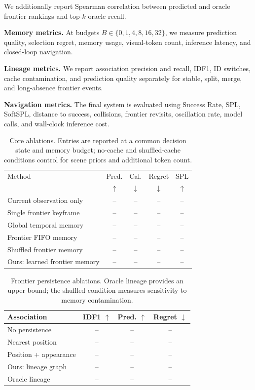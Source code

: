 \documentclass[10pt,twocolumn]{article}
\begin{document}
We additionally report Spearman correlation between predicted and oracle
frontier rankings and top-\(k\) oracle recall.

\textbf{Memory metrics.}
At budgets \(B\in\{0,1,4,8,16,32\}\), we measure prediction quality,
selection regret, memory usage, visual-token count, inference latency, and
closed-loop navigation.

\textbf{Lineage metrics.}
We report association precision and recall, IDF1, ID switches, cache
contamination, and prediction quality separately for stable, split, merge,
and long-absence frontier events.

\textbf{Navigation metrics.}
The final system is evaluated using Success Rate, SPL, SoftSPL, distance to
success, collisions, frontier revisits, oscillation rate, model calls, and
wall-clock inference cost.

\begin{table}[t]
\centering
\footnotesize
\setlength{\tabcolsep}{3.5pt}
\caption{Core ablations. Entries are reported at a common decision state and
memory budget; no-cache and shuffled-cache conditions control for scene priors
and additional token count.}
\label{tab:ablations}
\begin{tabular}{lcccc}
\toprule
Method & Pred. & Cal. & Regret & SPL\\
& \(\uparrow\) & \(\downarrow\) & \(\downarrow\) & \(\uparrow\)\\
\midrule
Current observation only & -- & -- & -- & --\\
Single frontier keyframe & -- & -- & -- & --\\
Global temporal memory & -- & -- & -- & --\\
Frontier FIFO memory & -- & -- & -- & --\\
Shuffled frontier memory & -- & -- & -- & --\\
Ours: learned frontier memory & -- & -- & -- & --\\
\bottomrule
\end{tabular}
\end{table}

\begin{table}[t]
\centering
\footnotesize
\setlength{\tabcolsep}{4pt}
\caption{Frontier persistence ablations. Oracle lineage provides an upper
bound; the shuffled condition measures sensitivity to memory contamination.}
\label{tab:lineage}
\begin{tabular}{lccc}
\toprule
Association & IDF1 \(\uparrow\) & Pred. \(\uparrow\) & Regret \(\downarrow\)\\
\midrule
No persistence & -- & -- & --\\
Nearest position & -- & -- & --\\
Position + appearance & -- & -- & --\\
Ours: lineage graph & -- & -- & --\\
Oracle lineage & -- & -- & --\\
\bottomrule
\end{tabular}
\end{table}
\end{document}
